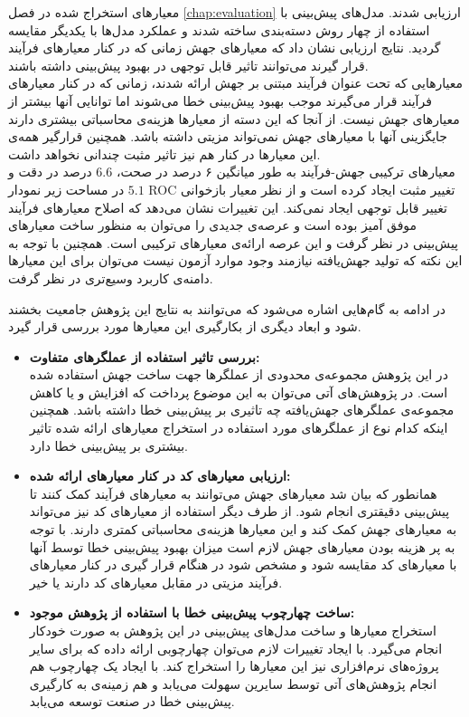 معیارهای استخراج شده در فصل \ref{chap:evaluation} ارزیابی شدند.  مدل‌های پیش‌بینی با استفاده از  چهار روش دسته‌بندی ساخته شدند و عملکرد مدل‌ها با یکدیگر مقایسه گردید. نتایج ارزیابی نشان داد که معیارهای جهش زمانی که در کنار معیارهای فرآیند قرار گیرند می‌توانند تاثیر قابل توجهی در بهبود پیش‌بینی داشته باشند.\\
 معیارهایی که تحت عنوان فرآیند مبتنی بر جهش ارائه شدند، زمانی که در کنار معیارهای فرآیند قرار می‌گیرند موجب بهبود پیش‌بینی خطا می‌شوند اما توانایی آنها بیشتر از معیارهای جهش نیست. از آنجا که این دسته از معیارها هزینه‌ی محاسباتی بیشتری دارند جایگزینی آنها با معیارهای جهش نمی‌تواند مزیتی داشته باشد. همچنین قرارگیر همه‌ی این معیارها در کنار هم نیز تاثیر مثبت چندانی نخواهد داشت.\\
 معیارهای ترکیبی جهش-فرآیند به طور میانگین ۶ درصد در صحت، $6.6$ درصد در دقت و $5.1$ در مساحت زیر نمودار ROC تغییر مثبت ایجاد کرده است و از نظر معیار بازخوانی تغییر قابل توجهی ایجاد نمی‌کند. این تغییرات نشان می‌دهد که اصلاح  معیارهای فرآیند موفق آمیز بوده است و عرصه‌ی جدیدی را می‌توان به منظور ساخت معیارهای پیش‌بینی در نظر گرفت و این عرصه ارائه‌ی معیارهای ترکیبی است. همچنین با توجه به این نکته  که تولید جهش‌یافته نیازمند وجود موارد آزمون نیست می‌توان برای این معیارها دامنه‌ی کاربرد وسیع‌تری در نظر گرفت. 

در ادامه به گام‌هایی اشاره می‌شود که می‌توانند  به نتایج این پژوهش   جامعیت بخشند شود و ابعاد دیگری از بکارگیری این معیارها  مورد بررسی قرار گیرد.

\begin{itemize}
	\item
	\textbf{بررسی تاثیر استفاده از عملگرهای متفاوت:}\\
	در این پژوهش مجموعه‌ی محدودی از عملگرها جهت ساخت جهش استفاده شده است. در پژوهش‌های آتی می‌توان به این موضوع پرداخت که افزایش و یا  کاهش مجموعه‌ی عملگرهای جهش‌یافته چه تاثیری بر پیش‌بینی خطا داشته باشد. همچنین اینکه کدام نوع از عملگرهای مورد استفاده در استخراج معیارهای ارائه شده تاثیر بیشتری بر پیش‌بینی خطا دارد. 
	\item
	\textbf{ارزیابی معیارهای کد در کنار معیارهای ارائه شده:}\\
همانطور که بیان شد معیارهای جهش می‌توانند به معیارهای فرآیند کمک کنند تا پیش‌بینی دقیقتری انجام شود. از طرف دیگر استفاده از معیارهای کد نیز می‌تواند به معیارهای جهش کمک کند و این معیارها هزینه‌ی محاسباتی کمتری دارند. با توجه به پر هزینه بودن معیارهای جهش لازم است میزان بهبود پیش‌بینی  خطا توسط آنها با معیارهای کد مقایسه شود و مشخص شود  در هنگام قرار گیری در کنار معیارهای فرآیند مزیتی در مقابل معیارهای کد دارند یا خیر. 
\item
\textbf{ساخت چهارچوب پیش‌بینی خطا با استفاده از پژوهش موجود:}\\
استخراج معیارها و ساخت مدل‌های پیش‌بینی در این پژوهش به صورت خودکار انجام می‌گیرد. با ایجاد تغییرات لازم می‌توان چهارچوبی ارائه داده که برای سایر پروژه‌های نرم‌افزاری نیز این معیارها را استخراج کند. با ایجاد یک چهارچوب هم انجام پژوهش‌های آتی توسط سایرین سهولت می‌یابد و هم زمینه‌ی به کارگیری پیش‌بینی خطا در صنعت توسعه می‌یابد. 
	
	
\end{itemize}




